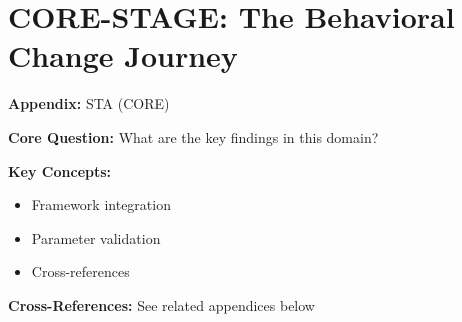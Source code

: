 %
%

\chapter{CORE-STAGE: The Behavioral Change Journey}
\label{app:core-stage}

\begin{tcolorbox}[colback=blue!5!white, colframe=blue!75!black,
    title=Quick Reference: Appendix UNMAPPED_STA]

\textbf{Appendix:} STA (CORE)

\textbf{Core Question:} What are the key findings in this domain?

\textbf{Key Concepts:}
\begin{itemize}[nosep]
\item Framework integration
\item Parameter validation
\item Cross-references
\end{itemize}

\textbf{Cross-References:} See related appendices below
\end{tcolorbox}

